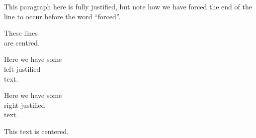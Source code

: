 \documentclass[a4paper]{report}
\begin{document}
This paragraph here is fully justified, but note how we have \linebreak forced the end of the line to occur before the word “forced”.

\begin{center}
These lines\\
are centred.
\end{center}

\begin{flushleft}
Here we have some\\
left justified\\
text.
\end{flushleft}

\begin{flushright}
Here we have some\\
right justified\\
text.  
\end{flushright}
\centerline{This text is centered.}
\end{document}
